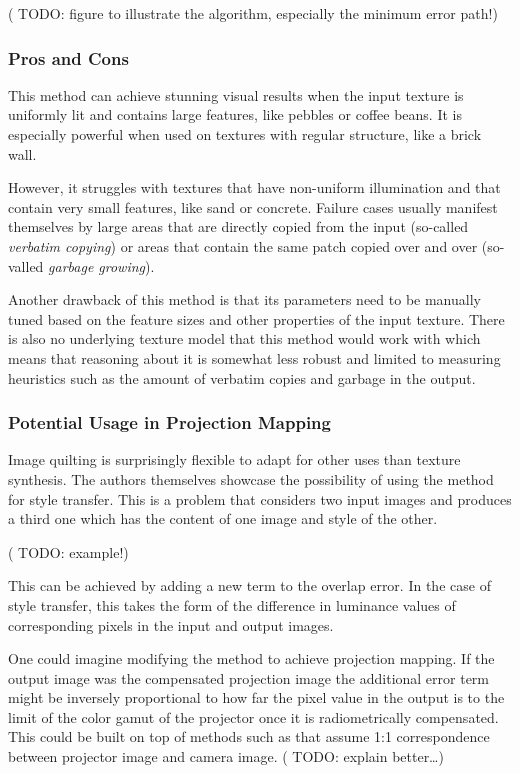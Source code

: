 ({\color{red} TODO: figure to illustrate the algorithm, especially the minimum error path!})

\subsubsection{Pros and Cons}
\label{section:background-texture_synthesis-patch_based-pros_and_cons}

This method can achieve stunning visual results when the input texture is uniformly lit and contains large features, like pebbles or coffee beans. It is especially powerful when used on textures with regular structure, like a brick wall.

However, it struggles with textures that have non-uniform illumination and that contain very small features, like sand or concrete. Failure cases usually manifest themselves by large areas that are directly copied from the input (so-called \textit{verbatim copying}) or areas that contain the same patch copied over and over (so-valled \textit{garbage growing}).

Another drawback of this method is that its parameters need to be manually tuned based on the feature sizes and other properties of the input texture. There is also no underlying texture model that this method would work with which means that reasoning about it is somewhat less robust and limited to measuring heuristics such as the amount of verbatim copies and garbage in the output.

\subsubsection{Potential Usage in Projection Mapping}
\label{section:background-texture_synthesis-patch_based-projection_mapping}

Image quilting is surprisingly flexible to adapt for other uses than texture synthesis. The authors themselves showcase the possibility of using the method for style transfer. This is a problem that considers two input images and produces a third one which has the content of one image and style of the other.

({\color{red} TODO: example!})

This can be achieved by adding a new term to the overlap error. In the case of style transfer, this takes the form of the difference in luminance values of corresponding pixels in the input and output images.

One could imagine modifying the method to achieve projection mapping. If the output image was the compensated projection image the additional error term might be inversely proportional to how far the pixel value in the output is to the limit of the color gamut of the projector once it is radiometrically compensated. This could be built on top of methods such as \citet{Grundhofer2015} that assume 1:1 correspondence between projector image and camera image. ({\color{red} TODO: explain better\dots})

